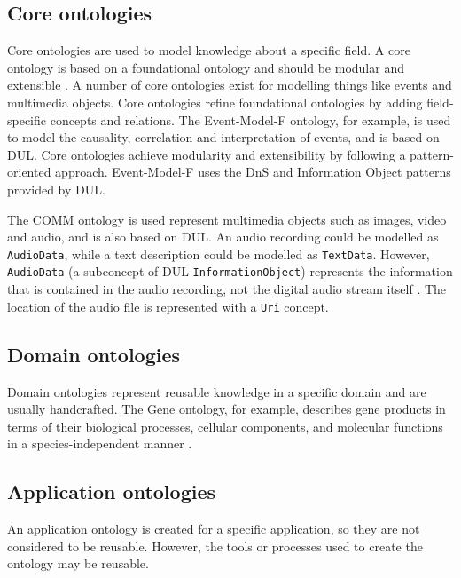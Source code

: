 \subsection{Core ontologies}

Core ontologies are used to model knowledge about a specific field. A core ontology is based on a foundational ontology and should be modular and extensible \cite{Scherp2011}. A number of core ontologies exist for modelling things like events and multimedia objects. Core ontologies refine foundational ontologies by adding field-specific concepts and relations. The Event-Model-F ontology, for example, is used to model the causality, correlation and interpretation of events, and is based on \ac{DUL}. Core ontologies achieve modularity and extensibility by following a pattern-oriented approach. Event-Model-F uses the \ac{DnS} and Information Object patterns provided by \ac{DUL}. 

The \ac{COMM} ontology is used represent multimedia objects such as images, video and audio, and is also based on \ac{DUL}. An audio recording could be modelled as \texttt{AudioData}, while a text description could be modelled as \texttt{TextData}. However, \texttt{AudioData} (a subconcept of \ac{DUL} \texttt{InformationObject}) represents the information that is contained in the audio recording, not the digital audio stream itself \cite{Scherp2011}. The location of the audio file is represented with a \texttt{Uri} concept. 

\subsection{Domain ontologies}
Domain ontologies represent reusable knowledge in a specific domain and are usually handcrafted. The Gene ontology, for example, describes gene products in terms of their biological processes, cellular components, and molecular functions in a species-independent manner \cite{Jepsen2009}. 

\subsection{Application ontologies} 
An application ontology is created for a specific application, so they are not considered to be reusable. However, the tools or processes used to create the ontology may be reusable. 


